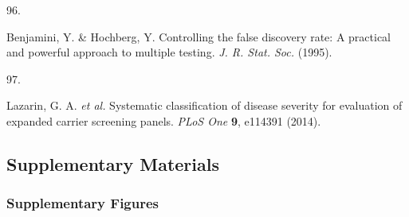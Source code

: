 \documentclass[
]{article}
\newlength{\cslhangindent}
\newlength{\csllabelwidth}
\newenvironment{CSLReferences}[2] %
 {\begin{list}{}{%
  \setlength{\itemindent}{0pt}
  \setlength{\leftmargin}{0pt}
  \setlength{\parsep}{0pt}
  \ifodd #1
   \setlength{\leftmargin}{\cslhangindent}
   \setlength{\itemindent}{-1\cslhangindent}
  \fi
  \setlength{\itemsep}{#2\baselineskip}}}
 {\end{list}}
\newcommand{\CSLLeftMargin}[1]{\parbox[t]{\csllabelwidth}{\strut#1\strut}}
\newcommand{\CSLRightInline}[1]{\parbox[t]{\linewidth - \csllabelwidth}{\strut#1\strut}}
\begin{document}
\begin{CSLReferences}{0}{0}
\CSLLeftMargin{96. }%
\CSLRightInline{Benjamini, Y. \& Hochberg, Y. Controlling the false
discovery rate: A practical and powerful approach to multiple testing.
\emph{J. R. Stat. Soc.} (1995).}

\CSLLeftMargin{97. }%
\CSLRightInline{Lazarin, G. A. \emph{et al.} Systematic classification
of disease severity for evaluation of expanded carrier screening panels.
\emph{PLoS One} \textbf{9}, e114391 (2014).}

\end{CSLReferences}

\hfill\break

\newpage{}

\subsection{Supplementary Materials}\label{supplementary-materials}

\subsubsection{Supplementary Figures}\label{supplementary-figures}
\end{document}
